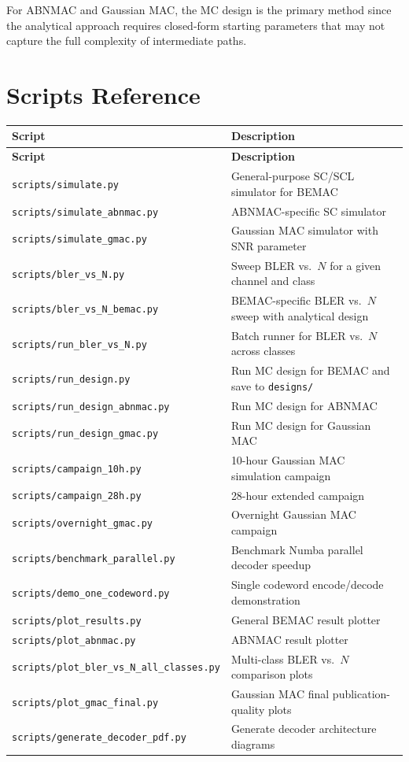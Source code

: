 \documentclass[11pt,a4paper]{article}
\begin{document}
For ABNMAC and Gaussian MAC, the MC design is the primary method since the
analytical approach requires closed-form starting parameters that may not
capture the full complexity of intermediate paths.


\section{Scripts Reference}
\label{sec:scripts}

\begin{longtable}{p{5.5cm}p{9.5cm}}
\toprule
\textbf{Script} & \textbf{Description} \\
\midrule
\endfirsthead
\toprule
\textbf{Script} & \textbf{Description} \\
\midrule
\endhead
\texttt{scripts/simulate.py}              & General-purpose SC/SCL simulator for BEMAC \\
\texttt{scripts/simulate\_abnmac.py}      & ABNMAC-specific SC simulator \\
\texttt{scripts/simulate\_gmac.py}        & Gaussian MAC simulator with SNR parameter \\
\texttt{scripts/bler\_vs\_N.py}           & Sweep BLER vs.\ $N$ for a given channel and class \\
\texttt{scripts/bler\_vs\_N\_bemac.py}    & BEMAC-specific BLER vs.\ $N$ sweep with analytical design \\
\texttt{scripts/run\_bler\_vs\_N.py}      & Batch runner for BLER vs.\ $N$ across classes \\
\texttt{scripts/run\_design.py}           & Run MC design for BEMAC and save to \texttt{designs/} \\
\texttt{scripts/run\_design\_abnmac.py}   & Run MC design for ABNMAC \\
\texttt{scripts/run\_design\_gmac.py}     & Run MC design for Gaussian MAC \\
\texttt{scripts/campaign\_10h.py}         & 10-hour Gaussian MAC simulation campaign \\
\texttt{scripts/campaign\_28h.py}         & 28-hour extended campaign \\
\texttt{scripts/overnight\_gmac.py}       & Overnight Gaussian MAC campaign \\
\texttt{scripts/benchmark\_parallel.py}   & Benchmark Numba parallel decoder speedup \\
\texttt{scripts/demo\_one\_codeword.py}   & Single codeword encode/decode demonstration \\
\texttt{scripts/plot\_results.py}         & General BEMAC result plotter \\
\texttt{scripts/plot\_abnmac.py}          & ABNMAC result plotter \\
\texttt{scripts/plot\_bler\_vs\_N\_all\_classes.py} & Multi-class BLER vs.\ $N$ comparison plots \\
\texttt{scripts/plot\_gmac\_final.py}     & Gaussian MAC final publication-quality plots \\
\texttt{scripts/generate\_decoder\_pdf.py}& Generate decoder architecture diagrams \\
\bottomrule
\end{longtable}
\end{document}
